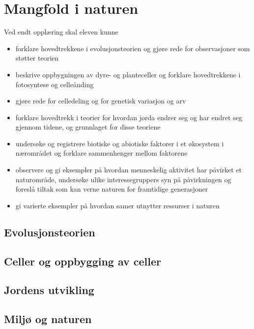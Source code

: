 \documentclass[main.tex]{subfiles}
\begin{document}
\section{Mangfold i naturen}
Ved endt opplæring skal eleven kunne
\begin{itemize}[noitemsep]
\item forklare hovedtrekkene i evolusjonsteorien og gjøre rede for observasjoner som støtter teorien
\item beskrive oppbygningen av dyre- og planteceller og forklare hovedtrekkene i fotosyntese og celleånding
\item gjøre rede for celledeling og for genetisk variasjon og arv
\item forklare hovedtrekk i teorier for hvordan jorda endrer seg og har endret seg gjennom tidene, og grunnlaget for disse teoriene
\item undersøke og registrere biotiske og abiotiske faktorer i et økosystem i nærområdet og forklare sammenhenger mellom faktorene
\item observere og gi eksempler på hvordan menneskelig aktivitet har påvirket et naturområde, undersøke ulike interessegruppers syn på påvirkningen og foreslå tiltak som kan verne naturen for framtidige generasjoner
\item gi varierte eksempler på hvordan samer utnytter ressurser i naturen
\end{itemize}

\subsection{Evolusjonsteorien}

\subsection{Celler og oppbygging av celler}

\subsection{Jordens utvikling}

\subsection{Miljø og naturen}
\end{document}
